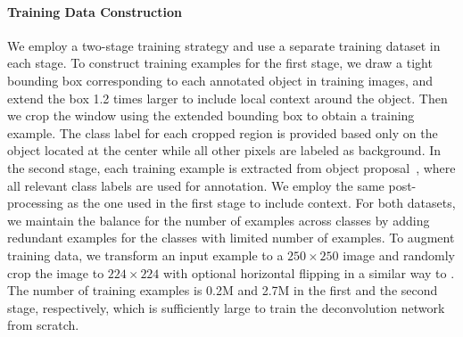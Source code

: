 \documentclass[10pt,twocolumn,letterpaper]{article}
\begin{document}
\paragraph{Training Data Construction}
We employ a two-stage training strategy and use a separate training dataset in each stage.
To construct training examples for the first stage, we draw a tight bounding box corresponding to each annotated object in training images, and extend the box 1.2 times larger to include local context around the object. 
Then we crop the window using the extended bounding box to obtain a training example.
The class label for each cropped region is provided based only on the object located at the center while all other pixels are labeled as background. 
In the second stage, each training example is extracted from object proposal~\cite{Edgebox}, where
all relevant class labels are used for annotation.
We employ the same post-processing as the one used in the first stage to include context.
For both datasets, we maintain the balance for the number of examples across classes by adding redundant examples for the classes with limited number of examples.
To augment training data, we transform an input example to a $250\times250$ image and randomly crop the image to $224\times224$ with optional horizontal flipping in a similar way to \cite{Vgg16}.
The number of training examples is 0.2M and 2.7M in the first and the second stage, respectively, which is sufficiently large to train the deconvolution network from scratch.


\iffalse
In second round training, we employ object proposals to construct training examples.
Specifically, candidate proposals significantly overlapped with ground truth segmentation (IOU $>$ 0.5) are set to positive examples. 
Then the same post-processing to first round training is applied to selected examples.
Using proposals to construct training data enforces more robustness to misaligned proposals during inference.
\fi


\iffalse
{\bf [Optimization] } \\
Optimization parameters: learning rate, SGD with momentum, weight decay, no drop-out, weight initialization (zero-mean gaussian), 
we follow the same way to optimize BN layers~\cite{}. 
\fi
\end{document}

